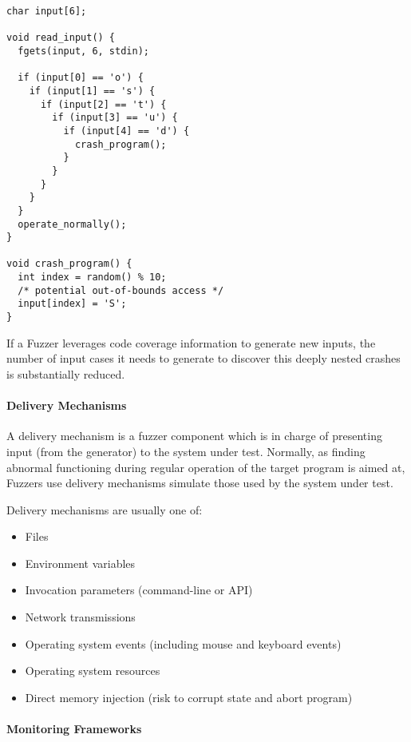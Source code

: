 \begin{lstlisting}[caption={If-Cascade Program}, label={lst:ifcascade},  style=CStyle, float, floatplacement=H]
char input[6];

void read_input() {
  fgets(input, 6, stdin);

  if (input[0] == 'o') {
    if (input[1] == 's') {
      if (input[2] == 't') {
        if (input[3] == 'u') {
          if (input[4] == 'd') {
            crash_program();
          }
        }
      }
    }
  }
  operate_normally();
}

void crash_program() {
  int index = random() % 10;
  /* potential out-of-bounds access */
  input[index] = 'S';
}
\end{lstlisting}

If a Fuzzer leverages code coverage information to generate new inputs, the number of input cases it needs to generate
to discover this deeply nested crashes is substantially reduced. %


\paragraph{Delivery Mechanisms}

A delivery mechanism is a fuzzer component which is in charge of presenting input (from the generator)
to the system under test. Normally, as finding abnormal functioning during regular operation of the
target program is aimed at, Fuzzers use delivery mechanisms simulate those used by the system under test\cite{mcnallyFuzzingStateArt2012}.

Delivery mechanisms are usually one of:

\begin{itemize}
    \item Files
    \item Environment variables
    \item Invocation parameters (command-line or API)
    \item Network transmissions
    \item Operating system events (including mouse and keyboard events)
    \item Operating system resources
    \item Direct memory injection (risk to corrupt state and abort program)
\end{itemize}


\paragraph{Monitoring Frameworks}


